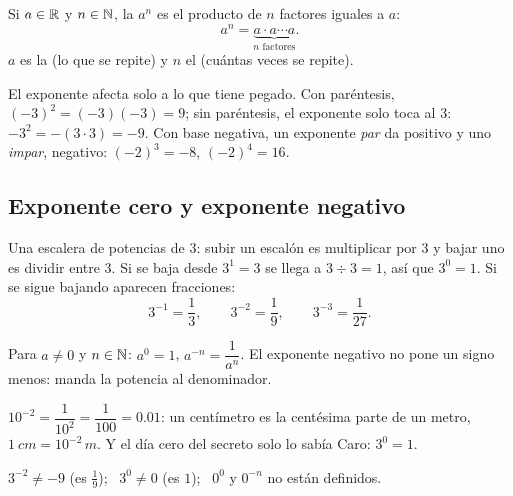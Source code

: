\documentclass[11pt,a4paper]{article}
\begin{document}
\begin{definicion}[Potencia]
Si $a\in\mathbb{R}$ y $n\in\mathbb{N}$, la  $a^{n}$ es el producto de $n$ factores iguales a $a$:
\[ a^{n}=\underbrace{a\cdot a\cdots a}_{n\text{ factores}}. \]
$a$ es la  (lo que se repite) y $n$ el  (cuántas veces se repite).
\end{definicion}

\begin{ojo}
El exponente afecta solo a lo que tiene pegado. Con paréntesis, $(-3)^{2}=(-3)(-3)=9$; sin paréntesis, el exponente solo
toca al $3$: $-3^{2}=-(3\cdot3)=-9$. Con base negativa, un exponente \emph{par} da positivo y uno \emph{impar}, negativo:
$(-2)^{3}=-8$, $(-2)^{4}=16$.
\end{ojo}

\subsection{Exponente cero y exponente negativo}
\begin{minipage}[c]{0.5\linewidth}
Una escalera de potencias de $3$: subir un escalón es multiplicar por $3$ y bajar uno es dividir entre $3$. Si se baja
desde $3^{1}=3$ se llega a $3\div3=1$, así que $3^{0}=1$. Si se sigue bajando aparecen fracciones:
\[ 3^{-1}=\frac13,\qquad 3^{-2}=\frac19,\qquad 3^{-3}=\frac1{27}. \]
\end{minipage}\hfill
\begin{minipage}[c]{0.46\linewidth}\centering
{}
\end{minipage}

\begin{definicion}
Para $a\neq0$ y $n\in\mathbb{N}$:
\qquad $a^{0}=1$, \qquad $a^{-n}=\dfrac{1}{a^{n}}$.
\quad El exponente negativo no pone un signo menos: manda la potencia al denominador.
\end{definicion}
\begin{ejemplo}
$10^{-2}=\dfrac1{10^{2}}=\dfrac1{100}=0.01$: un centímetro es la centésima parte de un metro, $\SI{1}{cm}=10^{-2}\,\si{m}$.
Y el día cero del secreto solo lo sabía Caro: $3^{0}=1$.
\end{ejemplo}
\begin{ojo}
$3^{-2}\neq-9$ (es $\tfrac19$); \ $3^{0}\neq0$ (es $1$); \ $0^{0}$ y $0^{-n}$ no están definidos.
\end{ojo}
\end{document}
